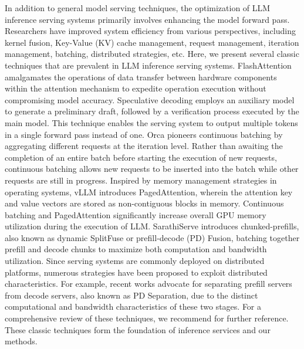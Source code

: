 

In addition to general model serving techniques, the optimization of LLM inference serving systems primarily involves enhancing the model forward pass. Researchers have improved system efficiency from various perspectives, including kernel fusion, Key-Value (KV) cache management, request management, iteration management, batching, distributed strategies, etc. Here, we present several classic techniques that are prevalent in LLM inference serving systems. FlashAttention \cite{dao2022flashattention} amalgamates the operations of data transfer between hardware components within the attention mechanism to expedite operation execution without compromising model accuracy. Speculative decoding \cite{leviathan2023fast, chen2023accelerating} employs an auxiliary model to generate a preliminary draft, followed by a verification process executed by the main model. This technique enables the serving system to output multiple tokens in a single forward pass instead of one. Orca \cite{yu2022orca} pioneers continuous batching by aggregating different requests at the iteration level. Rather than awaiting the completion of an entire batch before starting the execution of new requests, continuous batching allows new requests to be inserted into the batch while other requests are still in progress. Inspired by memory management strategies in operating systems, vLLM \cite{kwon2023efficient} introduces PagedAttention, wherein the attention key and value vectors are stored as non-contiguous blocks in memory. Continuous batching and PagedAttention significantly increase overall GPU memory utilization during the execution of LLM. SarathiServe \cite{agrawal2024sarathi} introduces chunked-prefills, also known as dynamic SplitFuse or prefill-decode (PD) Fusion, batching together prefill and decode chunks to maximize both computation and bandwidth utilization. Since serving systems are commonly deployed on distributed platforms, numerous strategies have been proposed to exploit distributed characteristics. For example, recent works \cite{patel2024splitwise,zhong2024distserve,hu2024inference} advocate for separating prefill servers from decode servers, also known as PD Separation, due to the distinct computational and bandwidth characteristics of these two stages. For a comprehensive review of these techniques, we recommend \cite{zhou2024survey} for further reference.
These classic techniques form the foundation of inference services and our methods. 

